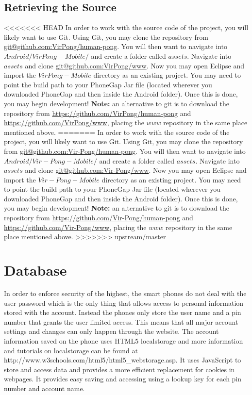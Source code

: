 \documentclass[12pt]{article}
\begin{document}
\begin{itemize}
\subsection{Retrieving the Source}
<<<<<<< HEAD
In order to work with the source code of the project, you will likely want to use Git\cite{Github}.  Using Git, you may clone the repository from \url{git@github.com:VirPong/human-pong}.  You will then want to navigate into $Android/VirPong-Mobile/$ and create a folder called $assets$.  Navigate into $assets$ and clone \url{git@github.com:VirPong/www}.  Now you may open Eclipse and import the $VirPong-Mobile$ directory as an existing project.  You may need to point the build path to your PhoneGap Jar file (located wherever you downloaded PhoneGap and then inside the Android folder).  Once this is done, you may begin development!  \textbf{Note:} an alternative to git is to download the repository from \url{https://github.com/VirPong/human-pong} and \url{https://github.com/VirPong/www}, placing the $www$ repository in the same place mentioned above.
=======
In order to work with the source code of the project, you will likely want to use Git\cite{Github}.  Using Git, you may clone the repository from \url{git@github.com:Vir-Pong/human-pong}.  You will then want to navigate into $Android/Vir-Pong-Mobile/$ and create a folder called $assets$.  Navigate into $assets$ and clone \url{git@github.com:Vir-Pong/www}.  Now you may open Eclipse and import the $Vir-Pong-Mobile$ directory as an existing project.  You may need to point the build path to your PhoneGap Jar file (located wherever you downloaded PhoneGap and then inside the Android folder).  Once this is done, you may begin development!  \textbf{Note:} an alternative to git is to download the repository from \url{https://github.com/Vir-Pong/human-pong} and \url{https://github.com/Vir-Pong/www}, placing the $www$ repository in the same place mentioned above.
>>>>>>> upstream/master

\section{Database}
In order to enforce security of the highest, the smart phones do not deal with the user password which is the only thing that allows access to personal information stored with the account. Instead the phones only store the user name and a pin number that grants the user limited access. This means that all major account settings and changes can only happen through the website. The account information saved on the phone uses HTML5 localstorage and more information and tutorials on localstorage can be found at http://www.w3schools.com/html5/html5_webstorage.asp. It uses JavaScript to store and access data and provides a more efficient replacement for cookies in webpages. It provides easy saving and accessing using a lookup key for each pin number and account name.


\end{itemize}
\end{document}
